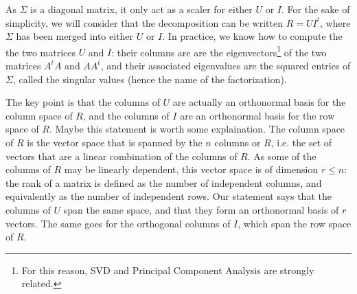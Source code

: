 As $\Sigma$ is a diagonal matrix, it only act as a scaler for either $U$ or
$I$. For the sake of simplicity, we will consider that the decomposition can be
written $R = UI^t$, where $\Sigma$ has been merged into either $U$ or $I$. In
practice, we know how to compute the the two matrices $U$ and $I$: their
columns are are the
eigenvectors\footnote{For this reason, SVD and Principal Component Analysis are
strongly related.} of the two matrices $A^tA$ and $AA^t$, and their associated
eigenvalues are the squared entries of $\Sigma$, called the singular values
(hence the name of the factorization).

The key point is that the columns of $U$ are actually an orthonormal basis for
the column space of $R$, and the columns of $I$ are an orthonormal basis for the
row space of $R$. Maybe this statement is worth some explaination. The column
space of $R$ is the vector space that is spanned by the $n$ columns or $R$,
i.e. the set of vectors that are a linear combination of the columns of $R$. As
some of the columns of $R$ may be linearly dependent, this vector space is of
dimension $r\leq n$: the rank of a matrix is defined as the number of
independent columns, and equivalently as the number of independent rows. Our
statement says that the columns of $U$ span the same space, and that they form
an orthonormal basis of $r$ vectors. The same goes for the orthogonal columns
of $I$, which span the row space of $R$.

